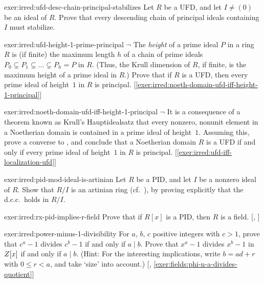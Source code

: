 \begin{exer}{}{exer:irred:ufd-desc-chain-principal-stabilizes}
  Let $R$ be a UFD, and let $I \neq (0)$ be an ideal of $R$. Prove
  that every descending chain of principal ideals containing $I$ must
  stabilize.
\end{exer}
\begin{exer}{}{exer:irred:ufd-height-1-prime-principal}
  $\lnot$ The \emph{height} of a prime ideal $P$ in a ring $R$ is (if
  finite) the maximum length $h$ of a chain of prime ideals
  $P_0 \subsetneq P_1 \subsetneq \dots \subsetneq P_h = P$ in
  $R$. (Thus, the Krull dimension of $R$, if finite, is the maximum
  height of a prime ideal in $R$.) Prove that if $R$ is a UFD, then
  every prime ideal of height~$1$ in $R$ is
  principal. [\ref{exer:irred:noeth-domain-ufd-iff-height-1-principal}]
\end{exer}
\begin{exer}{}{exer:irred:noeth-domain-ufd-iff-height-1-principal}
  $\lnot$ It is a consequence of a theorem known as Krull's
  Hauptidealsatz that every nonzero, nonunit element in a Noetherian
  domain is contained in a prime ideal of height~$1$. Assuming this,
  prove a converse to ,
  and conclude that a Noetherian domain $R$ is a UFD if and only if
  every prime ideal of height~$1$ in $R$ is
  principal. [\ref{exer:irred:ufd-iff-localization-ufd}]
\end{exer}
\begin{exer}{}{exer:irred:pid-mod-ideal-is-artinian}
  Let $R$ be a PID, and let $I$ be a nonzero ideal of $R$. Show that
  $R/I$ is an artinian ring (cf.\ ),
  by proving explicitly that the d.c.c.\ holds in $R/I$.
\end{exer}
\begin{exer}{}{exer:irred:rx-pid-implies-r-field}
  \exerused{} Prove that if $R[x]$ is a PID, then $R$ is a field.
  [,
  ]
\end{exer}
\begin{exer}{}{exer:irred:power-minus-1-divisibility}
  \exerused{} For $a$, $b$, $c$ positive integers with $c > 1$, prove
  that $c^a - 1$ divides $c^b - 1$ if and only if $a \mid b$. Prove
  that $x^a - 1$ divides $x^b - 1$ in $Z[x]$ if and only if
  $a \mid b$.  (Hint: For the interesting implications, write
  $b = ad + r$ with $0 \leq r < a$, and take `size' into account.)
  [,
  \ref{exer:fields:phi-n-a-divides-quotient}]
\end{exer}
